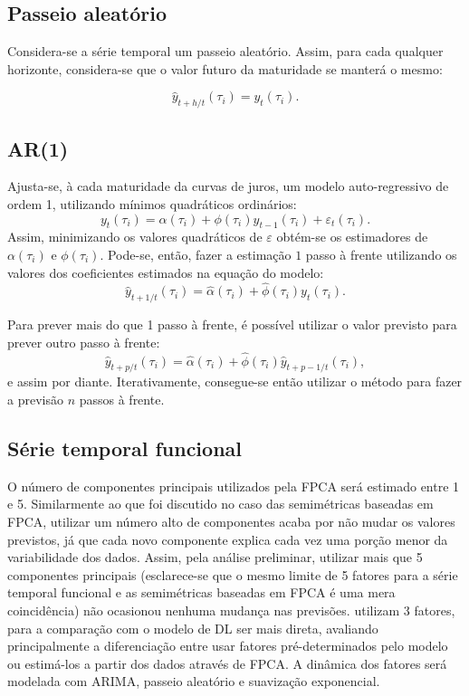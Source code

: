 \documentclass[
	12pt,				%
	openright,			%
	oneside,			%
	a4paper,			%
	english,			%
	brazil				%
	]{dissertacao-ufrgs-abntex2}
\begin{document}
\subsection{Passeio aleatório}
Considera-se a série temporal um passeio aleatório. Assim, para cada qualquer horizonte, considera-se que o valor futuro da maturidade se manterá o mesmo:

\begin{equation}
\hat{y}_{t+h/t}(\tau_i)=y_t(\tau_i).
\end{equation}


\subsection{AR(1)}
Ajusta-se, à cada maturidade da curvas de juros, um modelo auto-regressivo de ordem 1, utilizando mínimos quadráticos ordinários:
$$y_t(\tau_i)=\alpha(\tau_i) + \phi(\tau_i) y_{t-1}(\tau_i)+\varepsilon_{t}(\tau_i).$$
Assim, minimizando os valores quadráticos de $\varepsilon$ obtém-se os estimadores de $\alpha(\tau_i)$ e $\phi(\tau_i)$.
Pode-se, então, fazer a estimação $1$ passo à frente utilizando os valores dos coeficientes estimados na equação do modelo:
\begin{equation}
\hat{y}_{t+1/t}(\tau_i)=\hat{\alpha}(\tau_i) + \hat{\phi}(\tau_i) y_t(\tau_i).
\end{equation}

Para prever mais do que 1 passo à frente, é possível utilizar o valor previsto para prever outro passo à frente:
\begin{equation}
\hat{y}_{t+p/t}(\tau_i)=\hat{\alpha}(\tau_i) + \hat{\phi}(\tau_i) \hat{y}_{t+p-1/t}(\tau_i),
\end{equation}
e assim por diante. Iterativamente, consegue-se então utilizar o método para fazer a previsão $n$ passos à frente.

\subsection{Série temporal funcional}

O número de componentes principais utilizados pela FPCA será estimado entre 1 e 5. Similarmente ao que foi discutido no caso das semimétricas baseadas em FPCA, utilizar um número alto de componentes acaba por não mudar os valores previstos, já que cada novo componente explica cada vez uma porção menor da variabilidade dos dados. Assim, pela análise preliminar, utilizar mais que 5 componentes principais (esclarece-se que o mesmo limite de 5 fatores para a série temporal funcional e as semimétricas baseadas em FPCA é uma mera coincidência) não ocasionou nenhuma mudança nas previsões.  utilizam 3 fatores, para a comparação com o modelo de DL ser mais direta, avaliando principalmente a diferenciação entre usar fatores pré-determinados pelo modelo ou estimá-los a partir dos dados através de FPCA.
A dinâmica dos fatores será modelada com ARIMA, passeio aleatório e suavização exponencial.
\end{document}
